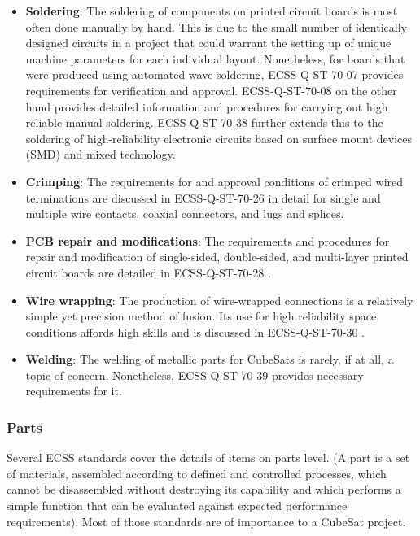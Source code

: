 \begin{itemize}
\item \textbf{Soldering}: The soldering of components on printed circuit boards is most often done manually by hand. This is due to the small number of identically designed circuits in a project that could warrant the setting up of unique machine parameters for each individual layout. Nonetheless, for boards that were produced using automated wave soldering, ECSS-Q-ST-70-07 \cite{ECSS-Q-ST-70-07} provides requirements for verification and approval. ECSS-Q-ST-70-08 \cite{ECSS-Q-ST-70-08} on the other hand provides detailed information and procedures for carrying out high reliable manual soldering. ECSS-Q-ST-70-38 \cite{ECSS-Q-ST-70-38} further extends this to the soldering of high-reliability electronic circuits based on surface mount devices (SMD) and mixed technology.
\item \textbf{Crimping}: The requirements for and approval conditions of crimped wired terminations are discussed in ECSS-Q-ST-70-26 \cite{ECSS-Q-ST-70-26} in detail for single and multiple wire contacts, coaxial connectors, and lugs and splices.
\item \textbf{PCB repair and modifications}: The requirements and procedures for repair and modification of single-sided, double-sided, and multi-layer printed circuit boards are detailed in ECSS-Q-ST-70-28 \cite{ECSS-Q-ST-70-28}.
\item \textbf{Wire wrapping}: The production of wire-wrapped connections is a relatively simple yet precision method of fusion. Its use for high reliability space conditions affords high skills and is discussed in ECSS-Q-ST-70-30 \cite{ECSS-Q-ST-70-30}.
\item \textbf{Welding}: The welding of metallic parts for CubeSats is rarely, if at all, a topic of concern. Nonetheless, ECSS-Q-ST-70-39 \cite{ECSS-Q-ST-70-39} provides necessary requirements for it. 
\end{itemize}

\subsubsection{Parts}

Several ECSS standards cover the details of items on parts level. (A part is a set of materials, assembled according to defined and controlled processes, which cannot be disassembled without destroying its capability and which performs a simple function that can be evaluated against expected performance requirements). Most of those standards are of importance to a CubeSat project.

